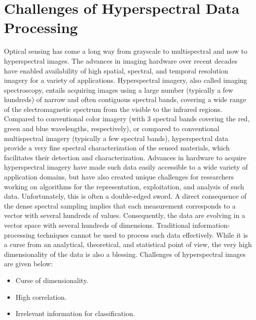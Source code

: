 \documentclass[document.tex]{subfiles}
\begin{document}
\section{Challenges of Hyperspectral Data Processing}
 \noindent Optical sensing has come a long way from grayscale to multispectral and now to hyperspectral images. The advances in imaging hardware over recent decades have enabled availability of high spatial, spectral, and temporal resolution imagery for a variety of applications. Hyperspectral imagery, also
called imaging spectroscopy, entails acquiring images using a
large number (typically a few hundreds) of narrow and often
contiguous spectral bands, covering a wide range of the electromagnetic spectrum from the visible to the infrared regions.
Compared to conventional color imagery (with 3 spectral bands
covering the red, green and blue wavelengths, respectively),
or compared to conventional multispectral imagery (typically
a few spectral bands), hyperspectral data provide a very fine
spectral characterization of the sensed materials, which facilitates their detection and characterization.
Advances in hardware to acquire hyperspectral imagery have
made such data easily accessible to a wide variety of application domains, but have also created unique challenges for
researchers working on algorithms for the representation, exploitation, and analysis of such data. Unfortunately, this is often
a double-edged sword. A direct consequence of the dense spectral sampling implies that each measurement corresponds to a
vector with several hundreds of values. Consequently, the data
are evolving in a vector space with several hundreds of dimensions. Traditional information-processing techniques cannot be
used to process such data effectively. While it is a curse from an
analytical, theoretical, and statistical point of view, the very high
dimensionality of the data is also a blessing. Challenges of hyperspectral images are given below:
\begin{itemize}
	\item Curse of dimensionality.
	\item High correlation.
	\item Irrelevant information for classification.
\end{itemize}
\end{document}

